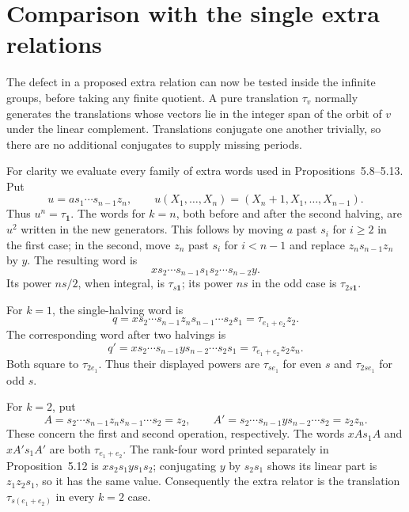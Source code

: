 \documentclass[11pt,a4paper]{article}
\newcommand{\one}{\mathbf1}
\begin{document}
\section{Comparison with the single extra relations}
The defect in a proposed extra relation can now be tested inside
the infinite groups, before taking any finite quotient. A pure
translation $\tau_v$ normally generates the translations whose
vectors lie in the integer span of the orbit of $v$ under the
linear complement. Translations conjugate one another trivially,
so there are no additional conjugates to supply missing periods.

For clarity we evaluate every family of extra words used in
Propositions~5.8--5.13. Put
\[
 u=as_1\cdots s_{n-1}z_n,
 \qquad u(X_1,\ldots,X_n)=(X_n+1,X_1,\ldots,X_{n-1}).
\]
Thus $u^n=\tau_\one$. The words for $k=n$, both before and
after the second halving, are $u^2$ written in the new generators.
This follows by moving $a$ past $s_i$ for $i\ge2$ in the first
case; in the second, move $z_n$ past $s_i$ for $i<n-1$ and
replace $z_ns_{n-1}z_n$ by $y$. The resulting word is
\[
 x s_2\cdots s_{n-1}s_1s_2\cdots s_{n-2}y.
\]
Its power $ns/2$, when integral, is $\tau_{s\one}$; its
power $ns$ in the odd case is $\tau_{2s\one}$.

For $k=1$, the single-halving word is
\[
 q=x s_2\cdots s_{n-1}z_ns_{n-1}\cdots s_2s_1
   =\tau_{e_1+e_2}z_2.
\]
The corresponding word after two halvings is
\[
 q'=x s_2\cdots s_{n-1}y s_{n-2}\cdots s_2s_1
    =\tau_{e_1+e_2}z_2z_n.
\]
Both square to $\tau_{2e_1}$. Thus their displayed powers
are $\tau_{se_1}$ for even $s$ and $\tau_{2se_1}$ for odd $s$.

For $k=2$, put
\[
 A=s_2\cdots s_{n-1}z_ns_{n-1}\cdots s_2=z_2,\qquad
 A'=s_2\cdots s_{n-1}y s_{n-2}\cdots s_2=z_2z_n.
\]
These concern the first and second operation, respectively.
The words $xAs_1A$ and $xA's_1A'$
are both $\tau_{e_1+e_2}$. The rank-four word printed separately
in Proposition~5.12 is $xs_2s_1ys_1s_2$; conjugating $y$
by $s_2s_1$ shows its linear part is $z_1z_2s_1$, so it has
the same value. Consequently the extra relator is the translation
$\tau_{s(e_1+e_2)}$ in every $k=2$ case.
\end{document}
